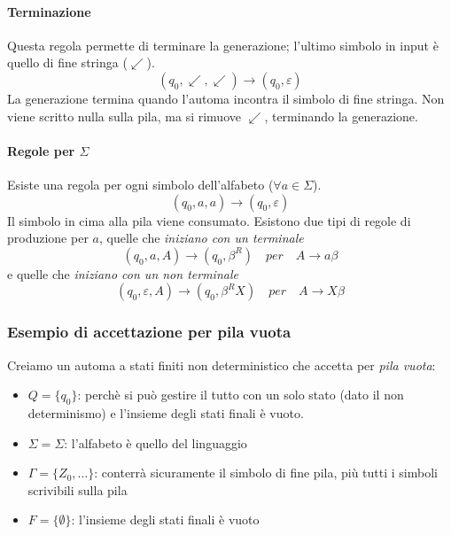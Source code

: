 \documentclass[11pt]{article}
\begin{document}
\paragraph*{Terminazione}
Questa regola permette di terminare la generazione; l'ultimo simbolo in input è quello di fine stringa ($\swarrow$).
\begin{equation*}
    (q_0,\swarrow,\swarrow)\rightarrow(q_0,\varepsilon)
\end{equation*}
La generazione termina quando l'automa incontra il simbolo di fine stringa. Non viene scritto nulla sulla pila, ma si rimuove 
$\swarrow$, terminando la generazione.
\paragraph*{Regole per $\Sigma$}
Esiste una regola per ogni simbolo dell'alfabeto ($\forall a\in \Sigma$).
\begin{equation*}
    (q_0,a,a)\rightarrow(q_0,\varepsilon)
\end{equation*}
Il simbolo in cima alla pila viene consumato.
Esistono due tipi di regole di produzione per $a$, quelle che \textit{iniziano con un terminale} 
\begin{equation*}
    (q_0,a,A)\rightarrow(q_0,\beta^R)\quad per \quad A\rightarrow a\beta
\end{equation*}
e quelle che \textit{iniziano con un non terminale}
\begin{equation*}
    (q_0,\varepsilon,A)\rightarrow(q_0,\beta^R X)\quad per \quad A\rightarrow X\beta
\end{equation*}
\subsubsection{Esempio di accettazione per pila vuota}
Creiamo un automa a stati finiti non deterministico che accetta per \textit{pila vuota}:
\begin{itemize}
    \item $Q=\{q_0\}$: perchè si può gestire il tutto con un solo stato (dato il non determinismo) e l'insieme degli stati finali è vuoto.
    \item $\Sigma=\Sigma$: l'alfabeto è quello del linguaggio
    \item $\Gamma=\{Z_0,\dots\}$: conterrà sicuramente il simbolo di fine pila, più tutti i simboli scrivibili sulla pila 
    \item $F=\{\emptyset\}$: l'insieme degli stati finali è vuoto
\end{itemize}
\end{document}

